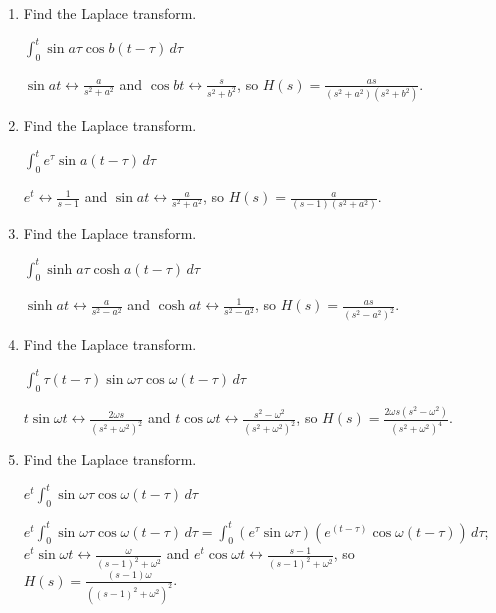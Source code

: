 \documentclass{ximera}
\begin{document}
\begin{problem}\label{exer:8.6.2}

\begin{enumerate}

\item Find the Laplace transform.

$\int_0^t\sin a\tau\cos b(t-\tau)\, d\tau$

\begin{solution}
$\sin at\leftrightarrow\frac{a}{s^2+a^2}$ and
$\cos bt\leftrightarrow\frac{s}{s^2+b^2}$, so
   $H(s)=\frac{a s}{(s^2+a^2)(s^2+b^2)}$.
\end{solution}

\item Find the Laplace transform.

$\int_0^t e^\tau\sin a(t-\tau)\,d\tau$ 

\begin{solution}
$e^t\leftrightarrow\frac{1}{s-1}$ and
$\sin at\leftrightarrow\frac{a}{s^2+a^2}$, so
$H(s)=\frac{a}{(s-1)(s^2+a^2)}$.
\end{solution}

\item Find the Laplace transform. 

$\int_0^t\sinh a\tau\cosh a(t-\tau)\,d\tau$

\begin{solution}
$\sinh at\leftrightarrow\frac{a}{s^2-a^2}$ and
$\cosh at\leftrightarrow\frac{1}{s^2-a^2}$, so
$H(s)=\frac{as}{(s^2-a^2)^2}$.
\end{solution}

\item Find the Laplace transform. 

$\int_0^t\tau(t-\tau)\sin \omega\tau\cos\omega
(t-\tau)\,d\tau$

\begin{solution}
$t\sin\omega t\leftrightarrow\frac{2\omega
s}{(s^2+\omega^2)^2}$ and $t\cos\omega
t\leftrightarrow\frac{s^2-\omega^2}{(s^2+\omega^2)^2}$, so
$H(s)=\frac{2\omega s (s^2-\omega^2)}{(s^2+\omega^2)^4}$.
\end{solution}

\item Find the Laplace transform. 

$e^t\int_0^t\sin\omega\tau
\cos\omega (t-\tau)\,d\tau$

\begin{solution}
$e^t\int_0^t\sin\omega\tau\cos\omega
(t-\tau)\,d\tau=\int_0^t
\left(e^\tau\sin\omega\tau\right)\left(e^{(t-\tau)}\cos\omega
(t-\tau)\right)\,d\tau$; $e^t\sin\omega
t\leftrightarrow\frac{\omega}{(s-1)^2+\omega^2}$ and $e^t\cos\omega
t\leftrightarrow\frac{s-1}{(s-1)^2+\omega^2}$, so
$H(s)=\frac{(s-1)\omega}{\left((s-1)^2+\omega^2\right)^2}$.
\end{solution}


\end{enumerate}
\end{problem}
\end{document}
